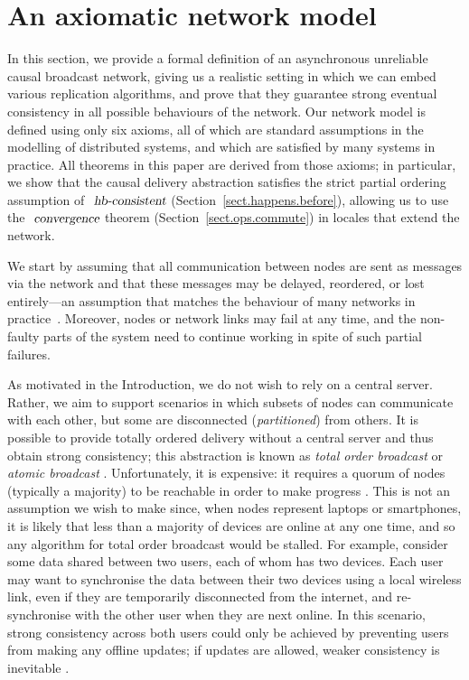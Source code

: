 \section{An axiomatic network model}
\label{sect.network}

In this section, we provide a formal definition of an asynchronous unreliable causal broadcast network, giving us a realistic setting in which we can embed various replication algorithms, and prove that they guarantee strong eventual consistency in all possible behaviours of the network.
Our network model is defined using only six axioms, all of which are standard assumptions in the modelling of distributed systems, and which are satisfied by many systems in practice.
All theorems in this paper are derived from those axioms; in particular, we show that the causal delivery abstraction satisfies the strict partial ordering assumption of $\isa{hb-consistent}$ (Section~\ref{sect.happens.before}), allowing us to use the $\isa{convergence}$ theorem (Section~\ref{sect.ops.commute}) in locales that extend the network.

We start by assuming that all communication between nodes are sent as messages via the network and that these messages may be delayed, reordered, or lost entirely---an assumption that matches the behaviour of many networks in practice~\cite{Bailis:2014jx}.
Moreover, nodes or network links may fail at any time, and the non-faulty parts of the system need
to continue working in spite of such partial failures.

As motivated in the Introduction, we do not wish to rely on a central server.
Rather, we aim to support scenarios in which subsets of nodes can communicate with each other, but some are disconnected (\emph{partitioned}) from others.
It is possible to provide totally ordered delivery without a central server and thus obtain strong consistency; this abstraction is known as \emph{total order broadcast} or \emph{atomic broadcast} \cite{Cachin:2011wt,Defago:2004ji}.
Unfortunately, it is expensive: it requires a quorum of nodes (typically a majority) to be reachable in order to make progress \cite{Chandra:1996cp}.
This is not an assumption we wish to make since, when nodes represent laptops or smartphones, it is likely that less than a majority of devices are online at any one time, and so any algorithm for total order broadcast would be stalled.
For example, consider some data shared between two users, each of whom has two devices. 
Each user may want to synchronise the data between their two devices using a local wireless link, even if they are temporarily disconnected from the internet, and re-synchronise with the other user when they are next online. 
In this scenario, strong consistency across both users could only be achieved by preventing users from making any offline updates; if updates are allowed, weaker consistency is inevitable \cite{Attiya:2015dm,Davidson:1985hv}.

